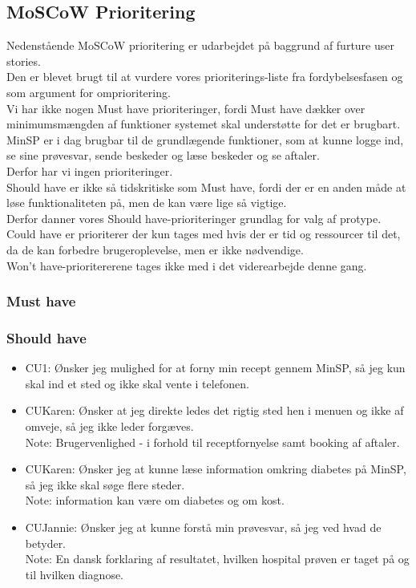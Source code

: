 \subsection{MoSCoW Prioritering}
Nedenstående MoSCoW prioritering er udarbejdet på baggrund af furture user stories.\\
Den er blevet brugt til at vurdere vores prioriterings-liste fra fordybelsesfasen og som argument for omprioritering.\\
Vi har ikke nogen Must have prioriteringer, fordi Must have dækker over minimumsmængden af funktioner systemet skal understøtte for det er brugbart.\\
MinSP er i dag brugbar til de grundlægende funktioner, som at kunne logge ind, se sine prøvesvar, sende beskeder og læse beskeder og se aftaler. \\
Derfor har vi ingen prioriteringer.\\
Should have er ikke så tidskritiske som Must have, fordi der er en anden måde at løse funktionaliteten på, men de kan være lige så vigtige.\\
Derfor danner vores Should have-prioriteringer grundlag for valg af protype.\\
Could have er prioriterer der kun tages med hvis der er tid og ressourcer til det, da de kan forbedre brugeroplevelse, men er ikke nødvendige. \\
Won't have-prioritererene tages ikke med i det viderearbejde denne gang.
\subsubsection*{Must have}
\subsubsection*{Should have}
\begin{itemize}
\item CU1: Ønsker jeg mulighed for at forny min recept gennem MinSP, så jeg kun skal ind et sted og ikke skal vente i telefonen.
\item CUKaren: Ønsker at jeg direkte ledes det rigtig sted hen i menuen og ikke af omveje, så jeg ikke leder forgæves. \\
Note: Brugervenlighed - i forhold til receptfornyelse samt booking af aftaler.
\item CUKaren: Ønsker jeg at kunne læse information omkring diabetes på MinSP, så jeg ikke skal søge flere steder. \\
Note: information kan være om diabetes og om kost.
\item CUJannie: Ønsker jeg at kunne forstå min prøvesvar, så jeg ved hvad de betyder. \\
Note: En dansk forklaring af resultatet, hvilken hospital prøven er taget på og til hvilken diagnose.
\end{itemize}
